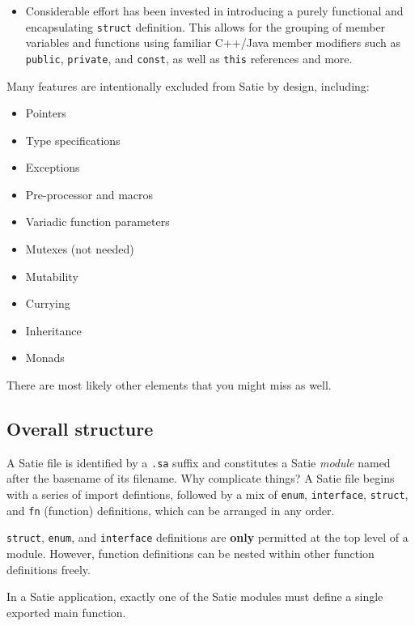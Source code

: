 \begin{itemize}
\tightlist
\item
  Considerable effort has been invested in introducing a purely
  functional and encapsulating \texttt{struct} definition. This allows
  for the grouping of member variables and functions using familiar
  C++/Java member modifiers such as \texttt{public}, \texttt{private},
  and \texttt{const}, as well as \texttt{this} references and more.
\end{itemize}

Many features are intentionally excluded from Satie by design,
including:

\begin{itemize}
\tightlist
\item
  Pointers
\item
  Type specifications
\item
  Exceptions
\item
  Pre-processor and macros
\item
  Variadic function parameters
\item
  Mutexes (not needed)
\item
  Mutability
\item
  Currying
\item
  Inheritance
\item
  Monads
\end{itemize}

There are most likely other elements that you might miss as well.

\hypertarget{overall-structure}{%
\subsection{Overall structure}\label{overall-structure}}

A Satie file is identified by a \texttt{.sa} suffix and constitutes a
Satie \emph{module} named after the basename of its filename. Why
complicate things? A Satie file begins with a series of import
defintions, followed by a mix of \texttt{enum}, \texttt{interface},
\texttt{struct}, and \texttt{fn} (function) definitions, which can be
arranged in any order.

\texttt{struct}, \texttt{enum}, and \texttt{interface} definitions are
\textbf{only} permitted at the top level of a module. However, function
definitions can be nested within other function definitions freely.

In a Satie application, exactly one of the Satie modules must define a
single exported main function.

